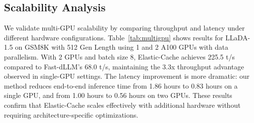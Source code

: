 \documentclass{article} %
\theoremstyle{definition}
\theoremstyle{remark}
\begin{document}
\begin{table}[h]
\centering
\caption{Computational overhead comparison. Cache update trigger has negligible cost compared to full attention computation (K=1024, H=32, D=128).}
\label{tab:compute-overhead}
\vspace{-0.1in}
\end{table}

\subsection{Scalability Analysis}

We validate multi-GPU scalability by comparing throughput and latency under different hardware configurations. Table~\ref{tab:multigpu} shows results for LLaDA-1.5 on GSM8K with 512 Gen Length using 1 and 2 A100 GPUs with data parallelism. With 2 GPUs and batch size 8, Elastic-Cache achieves 225.5 t/s compared to Fast-dLLM's 68.0 t/s, maintaining the 3.3x throughput advantage observed in single-GPU settings. The latency improvement is more dramatic: our method reduces end-to-end inference time from 1.86 hours to 0.83 hours on a single GPU, and from 1.00 hours to 0.56 hours on two GPUs. These results confirm that Elastic-Cache scales effectively with additional hardware without requiring architecture-specific optimizations.

\begin{table}[!htbp]
\centering
\caption{Multi-GPU scalability on GSM8K with 512 Gen Length (LLaDA-1.5). Throughput in t/s and latency in hours for full benchmark evaluation.}
\label{tab:multigpu}
\vspace{-0.1in}
\end{table}
\end{document}
